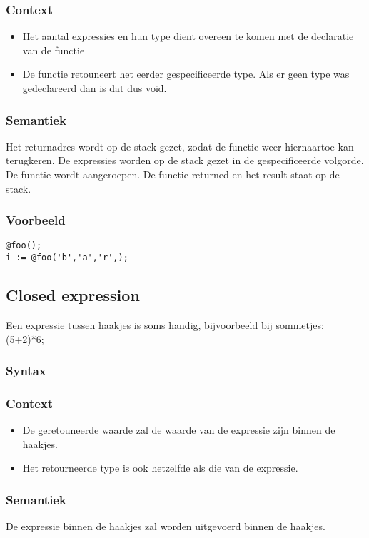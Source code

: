 \documentclass[]{article}
\begin{document}
\subsubsection{Context}
\begin{itemize}
\item Het aantal expressies en hun type dient overeen te komen met de declaratie van de functie
\item De functie retouneert het eerder gespecificeerde type. Als er geen type was gedeclareerd dan is dat dus void.
\end{itemize}
\subsubsection{Semantiek}
Het returnadres wordt op de stack gezet, zodat de functie weer hiernaartoe kan terugkeren.
De expressies worden op de stack gezet in de gespecificeerde volgorde.
De functie wordt aangeroepen.
De functie returned en het result staat op de stack.
\subsubsection{Voorbeeld}
\begin{lstlisting}[style=SELMA]
@foo();
i := @foo('b','a','r',);
\end{lstlisting}


\subsection{Closed expression}
Een expressie tussen haakjes is soms handig, bijvoorbeeld bij sommetjes: (5+2)*6;
\subsubsection{Syntax}

\subsubsection{Context}
\begin{itemize}
\item De geretouneerde waarde zal de waarde van de expressie zijn binnen de haakjes.
\item Het retourneerde type is ook hetzelfde als die van de expressie.
\end{itemize}
\subsubsection{Semantiek}
De expressie binnen de haakjes zal worden uitgevoerd binnen de haakjes.
\end{document}
